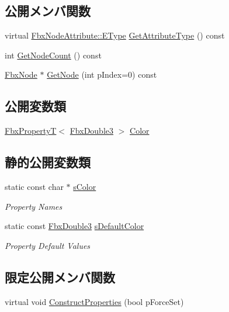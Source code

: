 \subsection*{公開メンバ関数}
\begin{DoxyCompactItemize}
\item 
virtual \hyperlink{class_fbx_node_attribute_a08e1669d3d1a696910756ab17de56d6a}{Fbx\+Node\+Attribute\+::\+E\+Type} \hyperlink{class_fbx_node_attribute_a1c2116756906127145a2b8721fc26752}{Get\+Attribute\+Type} () const
\item 
int \hyperlink{class_fbx_node_attribute_a72f38adeb0963e61bf5d156e76052370}{Get\+Node\+Count} () const
\item 
\hyperlink{class_fbx_node}{Fbx\+Node} $\ast$ \hyperlink{class_fbx_node_attribute_ac42128906415c993c6cb68588f9be149}{Get\+Node} (int p\+Index=0) const
\end{DoxyCompactItemize}
\subsection*{公開変数類}
\begin{DoxyCompactItemize}
\item 
\hyperlink{class_fbx_property_t}{Fbx\+PropertyT}$<$ \hyperlink{fbxtypes_8h_ae0a96f14cde566774c7553aa7523b7a7}{Fbx\+Double3} $>$ \hyperlink{class_fbx_node_attribute_a31f3a2361406eb670fa6ee3b5dffc864}{Color}
\end{DoxyCompactItemize}
\subsection*{静的公開変数類}
\begin{DoxyCompactItemize}
\item 
static const char $\ast$ \hyperlink{class_fbx_node_attribute_a0155b227cd9d72c796155bdda2c4c9e5}{s\+Color}
\begin{DoxyCompactList}\small\item\em Property Names \end{DoxyCompactList}\item 
static const \hyperlink{fbxtypes_8h_ae0a96f14cde566774c7553aa7523b7a7}{Fbx\+Double3} \hyperlink{class_fbx_node_attribute_a06cca505ad9c2964060cbcb3bbf6795b}{s\+Default\+Color}
\begin{DoxyCompactList}\small\item\em Property Default Values \end{DoxyCompactList}\end{DoxyCompactItemize}
\subsection*{限定公開メンバ関数}
\begin{DoxyCompactItemize}
\item 
virtual void \hyperlink{class_fbx_node_attribute_a042eb9949a9b9634dcc5f126e82fd04a}{Construct\+Properties} (bool p\+Force\+Set)
\end{DoxyCompactItemize}
